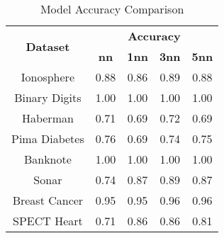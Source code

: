 \begin{table}[htbp]
\caption{Model Accuracy Comparison}
\begin{center}
\begin{tabular}{|c|c|c|c|c|}
\hline
\multirow{2}{*}{\textbf{Dataset}} & \multicolumn{4}{c|}{\textbf{Accuracy}} \\ \cline{2-5}
 & \textbf{nn} & \textbf{1nn} & \textbf{3nn} & \textbf{5nn} \\ \hline
Ionosphere & 0.88 & 0.86 & 0.89 & 0.88 \\ \hline
Binary Digits & 1.00 & 1.00 & 1.00 & 1.00 \\ \hline
Haberman & 0.71 & 0.69 & 0.72 & 0.69 \\ \hline
Pima Diabetes & 0.76 & 0.69 & 0.74 & 0.75 \\ \hline
Banknote & 1.00 & 1.00 & 1.00 & 1.00 \\ \hline
Sonar & 0.74 & 0.87 & 0.89 & 0.87 \\ \hline
Breast Cancer & 0.95 & 0.95 & 0.96 & 0.96 \\ \hline
SPECT Heart & 0.71 & 0.86 & 0.86 & 0.81 \\ \hline
\end{tabular}
\label{tab:accuracy}
\end{center}
\end{table}
